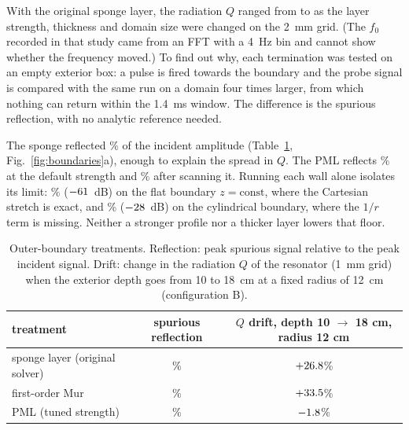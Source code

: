 \documentclass[11pt,a4paper]{article}
\begin{document}
With the original sponge layer, the radiation $Q$ ranged from \spongeQmin{} to \spongeQmax{}
as the layer strength, thickness and domain size were changed on the 2~mm grid. (The $f_0$
recorded in that study came from an FFT with a 4~Hz bin and cannot show whether the frequency
moved.) To find out why, each termination was tested on an empty exterior box: a pulse is
fired towards the boundary and the probe signal is compared with the same run on a domain
four times larger, from which nothing can return within the 1.4~ms window. The difference is
the spurious reflection, with no analytic reference needed.

The sponge reflected \% of the incident amplitude (Table~\ref{tab:pml},
Fig.~\ref{fig:boundaries}a), enough to explain the spread in $Q$. The PML reflects
\% at the default strength and \% after scanning it. Running each wall
alone isolates its limit: \% ($-61$~dB) on the flat boundary
$z=\mathrm{const}$, where the Cartesian stretch is exact, and \%
($-28$~dB) on the cylindrical boundary, where the $1/r$ term is missing. Neither a
stronger profile nor a thicker layer lowers that floor.

\begin{table}[t]
\centering
\caption{Outer-boundary treatments. Reflection: peak spurious signal relative to the peak
incident signal. Drift: change in the radiation $Q$ of the resonator (1~mm grid) when the
exterior depth goes from 10 to 18~cm at a fixed radius of 12~cm (configuration B).}
\label{tab:pml}
\small
\begin{tabular}{lcc}
\toprule
treatment & spurious reflection & $Q$ drift, depth 10 $\to$ 18 cm, radius 12 cm \\
\midrule
sponge layer (original solver) & \% & $+26.8$\% \\
first-order Mur & \% & $+33.5$\% \\
PML (tuned strength) & \% & $-1.8$\% \\
\bottomrule
\end{tabular}
\end{table}
\end{document}
